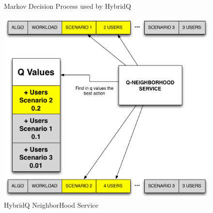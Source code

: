 \documentclass{bmcart}
\begin{document}
\begin{backmatter}
\begin{figure}[h!]
\begin{minipage}{.5\textwidth}
\caption{Markov Decision Process used by HybridQ}
\label{fig:mdphybridq}
\end{minipage}
\begin{minipage}{.5\textwidth}
\center
\includegraphics{./images/q-neighborservice.png}
\caption{HybridQ NeighborHood Service}
\label{fig:neighservice}
\end{minipage}
\end{figure}


\end{backmatter}
\end{document}
